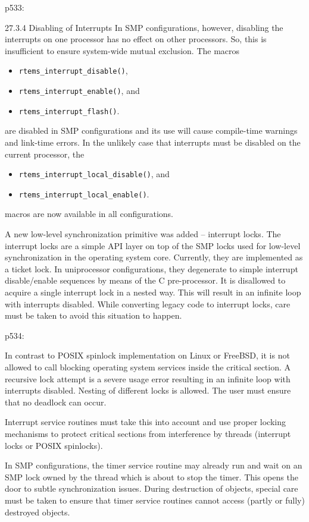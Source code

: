 p533:

27.3.4 Disabling of Interrupts
In SMP configurations,
however,
disabling the interrupts on one processor has no effect on other processors.
So,
this is insufficient to ensure system-wide mutual exclusion.
The macros
\begin{itemize}
  \item \verb"rtems_interrupt_disable()",
  \item \verb"rtems_interrupt_enable()", and
  \item \verb"rtems_interrupt_flash()".
\end{itemize}
are disabled in SMP configurations
and its use will cause compile-time warnings and link-time errors.
In the unlikely case that interrupts must be disabled on the current processor,
the
\begin{itemize}
  \item \verb"rtems_interrupt_local_disable()", and
  \item \verb"rtems_interrupt_local_enable()".
\end{itemize}
macros are now available in all configurations.

A new low-level synchronization primitive was added – interrupt locks.
The interrupt locks are a simple API layer
on top of the SMP locks used for low-level synchronization
in the operating system core.
Currently,
they are implemented as a ticket lock.
In uniprocessor configurations,
they degenerate to simple interrupt disable/enable sequences
by means of the C pre-processor.
It is disallowed to acquire a single interrupt lock in a nested way.
This will result in an infinite loop with interrupts disabled.
While converting legacy code to interrupt locks,
care must be taken to avoid this situation to happen.

p534:

In contrast to POSIX spinlock implementation on Linux or FreeBSD,
it is not allowed to call blocking operating system services
inside the critical section.
A recursive lock attempt is a severe usage error resulting in an infinite loop
with interrupts disabled.
Nesting of different locks is allowed.
The user must ensure that no deadlock can occur.

Interrupt service routines must take this into account
and use proper locking mechanisms
to protect critical sections
from interference by threads
(interrupt locks or POSIX spinlocks).

In SMP configurations,
the timer service routine may already run
and wait on an SMP lock owned by the thread which is about to stop the timer.
This opens the door to subtle synchronization issues.
During destruction of objects,
special care must be taken to ensure that
timer service routines cannot access (partly or fully) destroyed objects.

